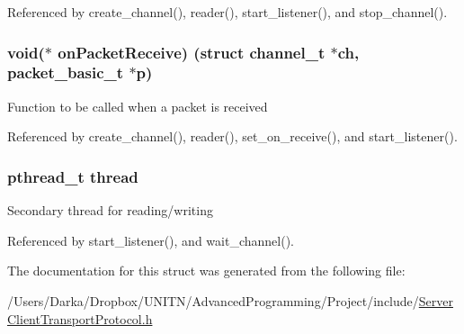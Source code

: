 Referenced by create\+\_\+channel(), reader(), start\+\_\+listener(), and stop\+\_\+channel().

\subsubsection[{\texorpdfstring{on\+Packet\+Receive}{onPacketReceive}}]{\setlength{\rightskip}{0pt plus 5cm}void($\ast$ on\+Packet\+Receive) (struct {\bf channel\+\_\+t} $\ast$ch, {\bf packet\+\_\+basic\+\_\+t} $\ast$p)}\hypertarget{structchannel__t_ae391524520adf65e91f52efaffb033a5}{}\label{structchannel__t_ae391524520adf65e91f52efaffb033a5}
Function to be called when a packet is received 

Referenced by create\+\_\+channel(), reader(), set\+\_\+on\+\_\+receive(), and start\+\_\+listener().

\subsubsection[{\texorpdfstring{thread}{thread}}]{\setlength{\rightskip}{0pt plus 5cm}pthread\+\_\+t thread}\hypertarget{structchannel__t_a01f75a9ad916f63a94e06a27635ba278}{}\label{structchannel__t_a01f75a9ad916f63a94e06a27635ba278}
Secondary thread for reading/writing 

Referenced by start\+\_\+listener(), and wait\+\_\+channel().



The documentation for this struct was generated from the following file\+:\begin{DoxyCompactItemize}
\item 
/\+Users/\+Darka/\+Dropbox/\+U\+N\+I\+T\+N/\+Advanced\+Programming/\+Project/include/\hyperlink{_server_client_transport_protocol_8h}{Server\+Client\+Transport\+Protocol.\+h}\end{DoxyCompactItemize}
